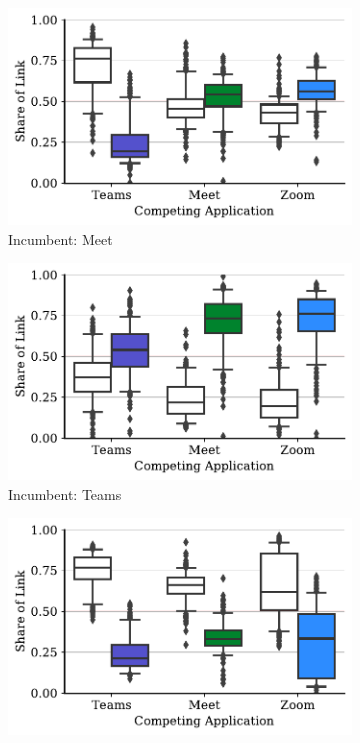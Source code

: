 \begin{figure}[t!]
\centering
\begin{subfigure}[t]{.33\textwidth}
    \centering
    \includegraphics[width=1\textwidth]{figures/comp/box_plot_meet_dl_0.5_all.pdf}
    \caption{Incumbent: Meet}
    \label{fig:meet-dl-boxplot-0.5}
\end{subfigure}\hfill
\begin{subfigure}[t]{.33\textwidth}
    \centering
    \includegraphics[width=1\textwidth]{figures/comp/box_plot_teams_dl_0.5_all.pdf}
    \caption{Incumbent: Teams}
    \label{fig:teams-dl-boxplot-0.5}
\end{subfigure}
\begin{subfigure}[t]{.33\textwidth}
    \centering
    \includegraphics[width=1\textwidth]{figures/comp/box_plot_zoom_dl_0.5_all.pdf}

\end{subfigure}
\end{figure}
